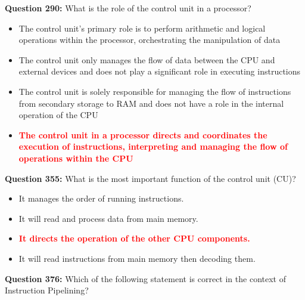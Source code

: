 \documentclass[12pt,a4paper]{article}
\begin{document}
\vspace{0.5cm}

\textbf{Question 290:} What is the role of the control unit in a processor?

\begin{itemize}
    \item[\textbf{A.}] The control unit's primary role is to perform arithmetic and logical operations within the processor, orchestrating the manipulation of data
    \item[\textbf{B.}] The control unit only manages the flow of data between the CPU and external devices and does not play a significant role in executing instructions
    \item[\textbf{C.}] The control unit is solely responsible for managing the flow of instructions from secondary storage to RAM and does not have a role in the internal operation of the CPU
    \item[\textbf{D.}] \textcolor{red}{\textbf{The control unit in a processor directs and coordinates the execution of instructions, interpreting and managing the flow of operations within the CPU}}
\end{itemize}

\vspace{0.5cm}

\textbf{Question 355:} What is the most important function of the control unit (CU)?

\begin{itemize}
    \item[\textbf{A.}] It manages the order of running instructions.
    \item[\textbf{B.}] It will read and process data from main memory.
    \item[\textbf{C.}] \textcolor{red}{\textbf{It directs the operation of the other CPU components.}}
    \item[\textbf{D.}] It will read instructions from main memory then decoding them.
\end{itemize}

\vspace{0.5cm}

\textbf{Question 376:} Which of the following statement is correct in the context of Instruction Pipelining?
\end{document}
